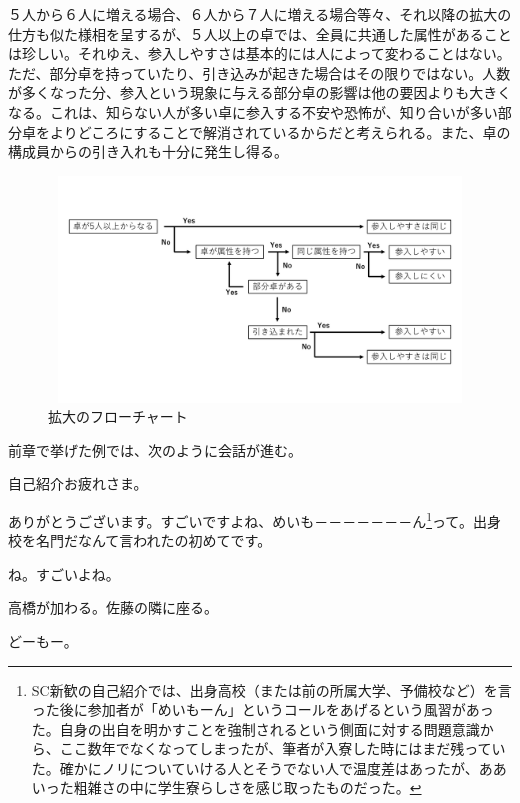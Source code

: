\begin{multicols}{2}
\par
５人から６人に増える場合、６人から７人に増える場合等々、それ以降の拡大の仕方も似た様相を呈するが、５人以上の卓では、全員に共通した属性があることは珍しい。それゆえ、参入しやすさは基本的には人によって変わることはない。ただ、部分卓を持っていたり、引き込みが起きた場合はその限りではない。人数が多くなった分、参入という現象に与える部分卓の影響は他の要因よりも大きくなる。これは、知らない人が多い卓に参入する不安や恐怖が、知り合いが多い部分卓をよりどころにすることで解消されているからだと考えられる。また、卓の構成員からの引き入れも十分に発生し得る。
\begin{figure}
  \centering
  \includegraphics[height=6cm,width=12cm]{2025shinki/konpa_furumai/figures/takunokakudai_flowchart.pdf}
  \caption{拡大のフローチャート}
  \label{fig:kakudai.flowchart}
\end{figure}
\par
前章で挙げた例では、次のように会話が進む。
\par
\dotfill
\par
{}
自己紹介お疲れさま。

ありがとうございます。すごいですよね、めいも－－－－－－－ん\footnote{SC新歓の自己紹介では、出身高校（または前の所属大学、予備校など）を言った後に参加者が「めいもーん」というコールをあげるという風習があった。自身の出自を明かすことを強制されるという側面に対する問題意識から、ここ数年でなくなってしまったが、筆者が入寮した時にはまだ残っていた。確かにノリについていける人とそうでない人で温度差はあったが、ああいった粗雑さの中に学生寮らしさを感じ取ったものだった。}って。出身校を名門だなんて言われたの初めてです。

ね。すごいよね。

高橋が加わる。佐藤の隣に座る。
\par
{}
どーもー。


\end{multicols}
